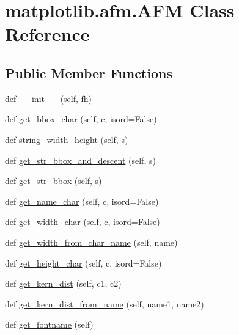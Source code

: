 \hypertarget{classmatplotlib_1_1afm_1_1AFM}{}\section{matplotlib.\+afm.\+A\+FM Class Reference}
\label{classmatplotlib_1_1afm_1_1AFM}
\subsection*{Public Member Functions}
\begin{DoxyCompactItemize}
\item 
def \hyperlink{classmatplotlib_1_1afm_1_1AFM_a4957a05d65a88f5c485ccc20a6548229}{\+\_\+\+\_\+init\+\_\+\+\_\+} (self, fh)
\item 
def \hyperlink{classmatplotlib_1_1afm_1_1AFM_aafb652ec5b377043b37e8278c3884abf}{get\+\_\+bbox\+\_\+char} (self, c, isord=False)
\item 
def \hyperlink{classmatplotlib_1_1afm_1_1AFM_a290ed63a3b5bcae829eb655720103d47}{string\+\_\+width\+\_\+height} (self, s)
\item 
def \hyperlink{classmatplotlib_1_1afm_1_1AFM_a165d6adb187a13a4eb58a59214f77304}{get\+\_\+str\+\_\+bbox\+\_\+and\+\_\+descent} (self, s)
\item 
def \hyperlink{classmatplotlib_1_1afm_1_1AFM_a0c26bbca9e0513130e94153df0cc6e6f}{get\+\_\+str\+\_\+bbox} (self, s)
\item 
def \hyperlink{classmatplotlib_1_1afm_1_1AFM_af32bdecad410d84fee541fed4f96a951}{get\+\_\+name\+\_\+char} (self, c, isord=False)
\item 
def \hyperlink{classmatplotlib_1_1afm_1_1AFM_ac60fbdf1f9741ed393bd34d8ce7e60f0}{get\+\_\+width\+\_\+char} (self, c, isord=False)
\item 
def \hyperlink{classmatplotlib_1_1afm_1_1AFM_a3c3da79ed7ab9fd32e01b3d437799756}{get\+\_\+width\+\_\+from\+\_\+char\+\_\+name} (self, name)
\item 
def \hyperlink{classmatplotlib_1_1afm_1_1AFM_a9a16c1910edd00502796173d8ad06588}{get\+\_\+height\+\_\+char} (self, c, isord=False)
\item 
def \hyperlink{classmatplotlib_1_1afm_1_1AFM_adbc3431c3bce53ff2f8b706fbd1de6d2}{get\+\_\+kern\+\_\+dist} (self, c1, c2)
\item 
def \hyperlink{classmatplotlib_1_1afm_1_1AFM_a3d3e0db1aa305145af9fc3afd58f444f}{get\+\_\+kern\+\_\+dist\+\_\+from\+\_\+name} (self, name1, name2)
\item 
def \hyperlink{classmatplotlib_1_1afm_1_1AFM_a762bd0ae11ebd7b1ee0335eb73e006e1}{get\+\_\+fontname} (self)

\end{DoxyCompactItemize}
